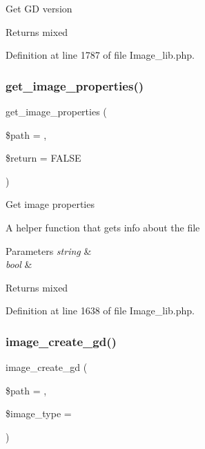 Get GD version

\begin{DoxyReturn}{Returns}
mixed 
\end{DoxyReturn}


Definition at line 1787 of file Image\+\_\+lib.\+php.

\mbox{\label{class_c_i___image__lib_a91627ce4406f63c429ab13aab8f0e53c}} 
\subsubsection{\texorpdfstring{get\_image\_properties()}{get\_image\_properties()}}
{\footnotesize\ttfamily get\+\_\+image\+\_\+properties (\begin{DoxyParamCaption}\item[{}]{\$path = {\ttfamily \textquotesingle{}\textquotesingle{}},  }\item[{}]{\$return = {\ttfamily FALSE} }\end{DoxyParamCaption})}

Get image properties

A helper function that gets info about the file


\begin{DoxyParams}{Parameters}
{\em string} & \\
\hline
{\em bool} & \\
\hline
\end{DoxyParams}
\begin{DoxyReturn}{Returns}
mixed 
\end{DoxyReturn}


Definition at line 1638 of file Image\+\_\+lib.\+php.

\mbox{\label{class_c_i___image__lib_a1a222111448274ffca4e59d8a473c5fc}} 
\subsubsection{\texorpdfstring{image\_create\_gd()}{image\_create\_gd()}}
{\footnotesize\ttfamily image\+\_\+create\+\_\+gd (\begin{DoxyParamCaption}\item[{}]{\$path = {\ttfamily \textquotesingle{}\textquotesingle{}},  }\item[{}]{\$image\+\_\+type = {\ttfamily \textquotesingle{}\textquotesingle{}} }\end{DoxyParamCaption})}

